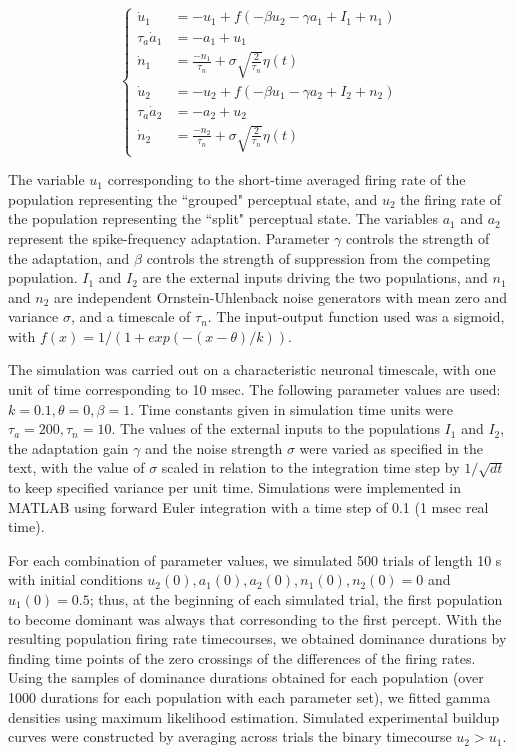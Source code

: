 \documentclass[10pt]{article}
\begin{document}
\begin{equation*}
	\begin{cases}
	\dot{u}_1 & = -u_1 +  f(-\beta u_2 - \gamma a_1 + I_1 + n_1) \\
	\tau_a \dot{a}_1 & = -a_1 + u_1\\
	\dot{n}_1 & = \frac{-n_1}{\tau_n} + \sigma \sqrt{\frac{2}{\tau_n}} \eta(t)\\
	\dot{u}_2 & = -u_2 +  f(-\beta u_1 - \gamma a_2 + I_2 + n_2) \\
	\tau_a \dot{a}_2 & = -a_2 + u_2\\
	\dot{n}_2 & = \frac{-n_2}{\tau_n } + \sigma \sqrt{\frac{2}{\tau_n}} \eta(t)
	
	\end{cases}
\end{equation*}

The variable $u_1$ corresponding to the short-time averaged firing rate of the population representing the ``grouped" perceptual state, and $u_2$ the firing rate of the population representing the ``split" perceptual state. The variables $a_1$ and $a_2$ represent the spike-frequency adaptation. Parameter $\gamma$ controls the strength of the adaptation, and $\beta$ controls the strength of suppression from the competing population. $I_1$ and $I_2$ are the external inputs driving the two populations, and $n_1$ and $n_2$ are independent Ornstein-Uhlenback noise generators with mean zero and variance $\sigma$, and a timescale of $\tau_n$. 
The input-output function used was a sigmoid, with $f (x) = 1/(1 + exp(−(x − \theta )/ k))$. 

The simulation was carried out on a characteristic neuronal timescale, with one unit of time corresponding to 10 msec. The following parameter values are used: $k = 0.1, \theta = 0, \beta = 1$. Time constants given in simulation time units were $\tau_a = 200, \tau_n = 10$. The values of the external inputs to the populations $I_1$ and $I_2$, the adaptation gain $\gamma$ and the noise strength $\sigma$ were varied as specified in the text, with the value of $\sigma$ scaled in relation to the integration time step by $1/\sqrt{dt}$ to keep specified variance per unit time. Simulations were implemented in MATLAB using forward Euler integration with a time step of 0.1 (1 msec real time).

For each combination of parameter values, we simulated 500 trials of length 10 s with initial conditions $u_2(0), a_1(0), a_2(0), n_1(0), n_2(0) = 0$ and $u_1(0) = 0.5$; thus, at the beginning of each simulated trial, the first population to become dominant was always that corresonding to the first percept. With the resulting population firing rate timecourses, we obtained dominance durations by finding time points of the zero crossings of the differences of the firing rates. Using the samples of dominance durations obtained for each population (over 1000 durations for each population with each parameter set), we fitted gamma densities using maximum likelihood estimation. Simulated experimental buildup curves were constructed by averaging across trials the binary timecourse $u_2 > u_1$. 
\end{document}
